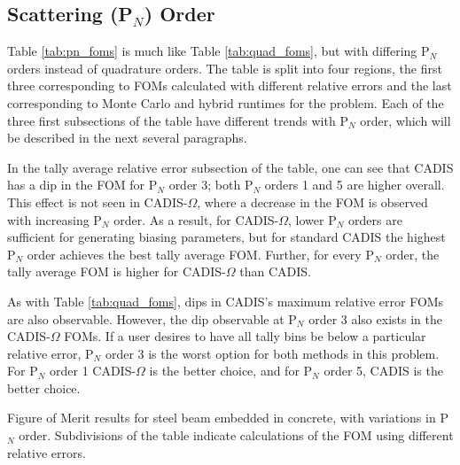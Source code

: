 
\subsection{Scattering (P$_N$) Order}
\label{subsec:pnorder}

Table \ref{tab:pn_foms} is much like Table \ref{tab:quad_foms}, but with
differing P$_N$ orders instead of quadrature orders. The table is split into four
regions, the first three corresponding to FOMs calculated with
different relative errors and the last corresponding to Monte Carlo and hybrid
runtimes for the problem. Each of the three first subsections of the table have
different trends with P$_N$ order, which will be described in the next several
paragraphs.

In the tally average relative error subsection of the table, one can see that
CADIS has a dip in the FOM for P$_N$ order 3; both P$_N$ orders 1 and 5 are
higher overall. This effect is not seen in CADIS-$\Omega$, where a decrease in
the FOM is observed with increasing P$_N$ order. As a result, for
CADIS-$\Omega$, lower P$_N$ orders are sufficient for generating biasing
parameters, but for standard CADIS the highest P$_N$ order achieves the best
tally average FOM. Further, for every P$_N$ order, the tally average FOM is
higher for CADIS-$\Omega$ than CADIS.

As with Table \ref{tab:quad_foms}, dips in CADIS's maximum relative error FOMs are also observable. 
However, the dip observable at
P$_N$ order 3 also exists in the CADIS-$\Omega$ FOMs. If a user desires to have all
tally bins be below a particular relative error, P$_N$ order 3 is the worst
option for both methods in this problem. For P$_N$ order 1 CADIS-$\Omega$ is the
better choice, and for P$_N$ order 5, CADIS is the better choice.

\begin{table}[h!]
  \centering
  
  \caption[Figure of Merit results for steel beam embedded in concrete, with
  variations in P$_{N}$ order.]{Figure of Merit results for steel beam embedded in concrete, with
    variations in P$_{N}$ order. Subdivisions of the table indicate
calculations of the FOM using different relative errors.}
  \label{tab:pn_foms}
\end{table}

